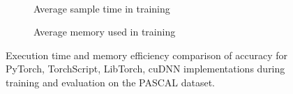 \documentclass[portrait,final,archD,fontscale=0.477]{baposter}
\begin{document}
\begin{poster}
{\begin{figure}[H]
\begin{subfigure}{0.45\linewidth}
      \end{subfigure}
      \\[2ex]
      \begin{subfigure}{0.45\linewidth}
        \centering
        \begin{adjustbox}{width=\textwidth}
          
        \end{adjustbox}
        \caption{Average sample time in training}\label{fig:train_avg_sample_time}
      \end{subfigure}
      \begin{subfigure}{0.45\linewidth}
        \centering
        \begin{adjustbox}{width=\textwidth}
          
        \end{adjustbox}
        \caption{Average memory used in training}\label{fig:train_avg_used_mem}
      \end{subfigure}
      \caption{Execution time and memory efficiency comparison of accuracy for PyTorch, TorchScript, LibTorch, cuDNN implementations during training and evaluation on the PASCAL dataset.}
      \label{fig:other_accuracy_results}
    \end{figure}

  }

\end{poster}
\end{document}
